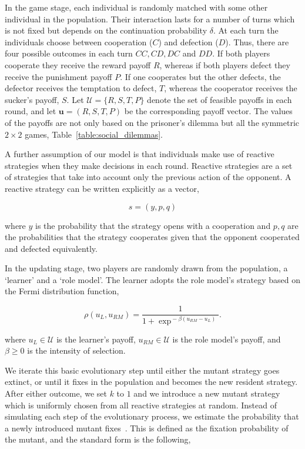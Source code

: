 \documentclass[11pt]{article}
\theoremstyle{plainCl1}
\theoremstyle{plainCl2}
\begin{document}
In the game stage, each individual is randomly matched with some other
individual in the population. Their interaction lasts for a number of turns
which is not fixed but depends on the continuation probability \(\delta\). At
each turn the individuals choose between cooperation (\(C\)) and defection
(\(D\)). Thus, there are four possible outcomes in each turn \(CC, CD, DC\) and
\(DD\). If both players cooperate they receive the reward payoff \(R\), whereas
if both players defect they receive the punishment payoff \(P\). If one
cooperates but the other defects, the defector receives the temptation to
defect, \(T\), whereas the cooperator receives the sucker's payoff, \(S\).
Let $\mathcal{U}=\{R,S,T,P\}$ denote the set of feasible payoffs in each round,
and let $\mathbf{u}\!=\!(R,S,T,P)$ be the corresponding payoff vector.
The values of the payoffs are not only based on the prisoner's dilemma but all
the symmetric \(2 \times 2\) games, Table~\ref{table:social_dilemmas}.

A further assumption of our model is that individuals make use of reactive
strategies when they make decisions in each round. Reactive strategies are a set
of strategies that take into account only the previous action of the opponent.
A reactive strategy can be written explicitly as a vector,

\[s=(y, p, q)\]

where \(y\) is the probability that the strategy opens with a cooperation and
\(p, q\) are the probabilities that the strategy cooperates given that the
opponent cooperated and defected equivalently.

In the updating stage, two players are randomly drawn from the population, a
`learner' and a `role model'. The learner adopts the role model's strategy
based on the Fermi distribution function, %

\begin{equation} \label{Eq:rho}
\rho(u_{L}, u_{RM}) = \frac{1}{1\!+\! \exp^{\!-\!\beta (u_{RM}\!-\!u_{L})}}.
\end{equation}

where $u_{L}\!\in\! \mathcal{U}$ is the learner's payoff, $u_{RM}\!\in\!
\mathcal{U}$ is the role model's payoff, and $\beta\!\ge\!0$ is the intensity of
selection.

We iterate this basic evolutionary step until either the mutant strategy goes
extinct, or until it fixes in the population and becomes the new resident
strategy. After either outcome, we set $k$ to $1$ and we introduce a new mutant
strategy which is uniformly chosen from all reactive strategies at random.
Instead of simulating each step of the evolutionary process, we estimate the
probability that a newly introduced mutant fixes~\cite{nowak2004emergence}. This
is defined as the fixation probability of the mutant, and the standard form is
the following,
\end{document}
